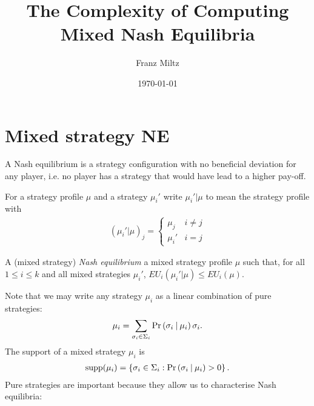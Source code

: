 \documentclass{article}
\begin{document}
\title{The Complexity of Computing Mixed Nash Equilibria}
\author{Franz Miltz}
\date{\today}
\maketitle

\section{Mixed strategy NE}

A Nash equilibrium is a strategy configuration with no beneficial
deviation for any player, i.e. no player has a strategy that would have
lead to a higher pay-off.

For a strategy profile $\mu$ and a strategy $\mu_i'$ write
$\mu_i' | \mu$ to mean the strategy profile with
\begin{align*}
  (\mu_i' | \mu)_j = \begin{cases}
    \mu_j & i\neq j \\
    \mu_i' & i = j
  \end{cases}
\end{align*}

\begin{definition}
  A (mixed strategy) \emph{Nash equilibrium} a mixed strategy profile $\mu$
  such that, for all $1\leq i\leq k$ and all mixed strategies $\mu_i'$,
  $EU_i(\mu_i' | \mu) \leq EU_i(\mu)$.
\end{definition}

Note that we may write any strategy $\mu_i$ as a linear
combination of pure strategies:
\begin{align*}
  \mu_i = \sum_{\sigma_i\in\Sigma_i} \Pr\left({{\sigma_i}\:|\:\mu_i}\right) \sigma_i.
\end{align*}
The support of a mixed strategy $\mu_i$ is
\begin{align*}
  \operatorname*{supp}(\mu_i) = \left\lbrace{\sigma_i \in \Sigma_i : \Pr\left({{\sigma_i}\:|\:\mu_i}\right) > 0}\right\rbrace.
\end{align*}
Pure strategies are important because they allow us to characterise
Nash equilibria:
\end{document}
